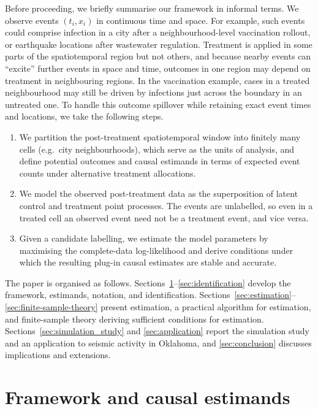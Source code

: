 \documentclass{statsoc}
\newcommand{\1}{\mathbbm{1}}
\begin{document}
Before proceeding, we briefly summarise our framework in informal terms. We observe events $(t_i,x_i)$ in continuous time and space. For example, such events could comprise infection in a city after a neighbourhood-level vaccination rollout, or earthquake locations after wastewater regulation. Treatment is applied in some parts of the spatiotemporal region but not others, and because nearby events can ``excite'' further events in space and time, outcomes in one region may depend on treatment in neighbouring regions. In the vaccination example, cases in a treated neighbourhood may still be driven by infections just across the boundary in an untreated one. To handle this outcome spillover while retaining exact event times and locations, we take the following steps.
\begin{enumerate}[label=(\roman*), nosep]
    \item We partition the post-treatment spatiotemporal window into finitely many cells (e.g.\ city neighbourhoods), which serve as the units of analysis, and define potential outcomes and causal estimands in terms of expected event counts under alternative treatment allocations.
    \item We model the observed post-treatment data as the superposition of latent control and treatment point processes. The events are unlabelled, so even in a treated cell an observed event need not be a treatment event, and vice versa.
    \item Given a candidate labelling, we estimate the model parameters by maximising the complete-data log-likelihood and derive conditions under which the resulting plug-in causal estimates are stable and accurate.
\end{enumerate}

The paper is organised as follows. Sections~\ref{sec:ppFramework}--\ref{sec:identification} develop the framework, estimands, notation, and identification. Sections~\ref{sec:estimation}--\ref{sec:finite-sample-theory} present estimation, a practical algorithm for estimation, and finite-sample theory deriving sufficient conditions for estimation. Sections~\ref{sec:simulation_study} and \ref{sec:application} report the simulation study and an application to seismic activity in Oklahoma, and \cref{sec:conclusion} discusses implications and extensions.

\section{Framework and causal estimands}\label{sec:ppFramework}
\end{document}
